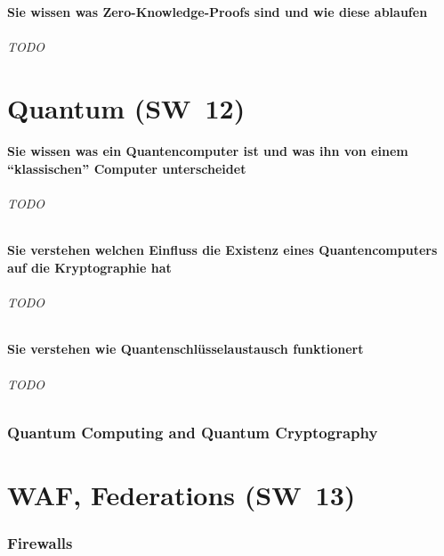 \documentclass[10pt,a4paper]{article}
\begin{document}
\subsection*{Sie wissen was Zero-Knowledge-Proofs sind und wie diese ablaufen}
\paragraph*{TODO}



\part{Quantum (SW~12)}
\subsection*{Sie wissen was ein Quantencomputer ist und was ihn von einem "`klassischen"' Computer unterscheidet}
\paragraph*{TODO}
\subsection*{Sie verstehen welchen Einfluss die Existenz eines Quantencomputers auf die Kryptographie hat}
\paragraph*{TODO}
\subsection*{Sie verstehen wie Quantenschlüsselaustausch funktionert}
\paragraph*{TODO}


\section{Quantum Computing and Quantum Cryptography}
\part{WAF, Federations (SW~13)}
\section{Firewalls}
\end{document}
